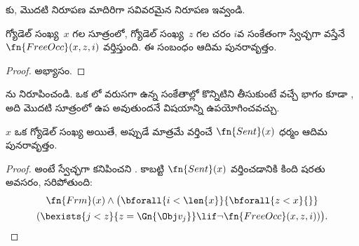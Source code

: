 \documentclass[../../../include/open-logic-section]{subfiles}
\begin{document}
\begin{prob}
కు,
 మొదటి నిరూపణ మాదిరిగా సవివరమైన
నిరూపణ ఇవ్వండి.
\end{prob}

\begin{prop}
గ్యోడెల్ సంఖ్య~$x$ గల సూత్రంలో, గ్యోడెల్ సంఖ్య~$z$ గల చరం $i$వ సంకేతంగా
స్వేచ్ఛగా వస్తేనే $\fn{FreeOcc}(x,z,i)$ వర్తిస్తుంది. ఈ సంబంధం ఆదిమ పునరావృత్తం.
\end{prop}

\begin{proof}
అభ్యాసం.
\end{proof}

\begin{prob}
ను నిరూపించండి. ఒక
లో వరుసగా ఉన్న సంకేతాల్లో కొన్నిటిని తీసుకుంటే
వచ్చే భాగం కూడా , అది మొదటి సూత్రంలో
ఉప అవుతుందనే విషయాన్ని ఉపయోగించవచ్చు.
\end{prob}

\begin{prop}
$x$ ఒక  గ్యోడెల్ సంఖ్య అయితే, అప్పుడే మాత్రమే వర్తించే
$\fn{Sent}(x)$ ధర్మం ఆదిమ పునరావృత్తం.
\end{prop}

\begin{proof}
 అంటే 
స్వేచ్ఛగా కనిపించని . కాబట్టి
$\fn{Sent}(x)$ వర్తించడానికి కింది షరతు అవసరం, సరిపోతుంది:
\begin{multline*}
\fn{Frm}(x) \land \bigl(\bforall{i<\len{x}}{\bforall{z<x}{}}\\
(\bexists{j<z}{z=\Gn{\Obj v_j}} \lif \lnot\fn{FreeOcc}(x,z,i))\bigr).
\end{multline*}
\end{proof}
\end{document}
